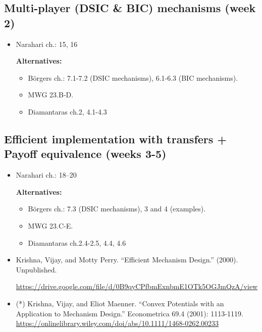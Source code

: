 \documentclass{article}
\begin{document}
\subsection{Multi-player (DSIC \& BIC) mechanisms (week 2)}
\begin{itemize}
	\item Narahari ch.: 15, 16
	
	\textbf{Alternatives:}
	\begin{itemize}
		\item B{\"o}rgers ch.: 7.1-7.2 (DSIC mechanisms), 6.1-6.3 (BIC mechanisms).%
		\item MWG 23.B-D.
		\item Diamantaras ch.2, 4.1-4.3
	\end{itemize}
\end{itemize}

\subsection{Efficient implementation with transfers + Payoff equivalence (weeks 3-5)}
\begin{itemize}
	\item Narahari ch.: 18--20
	
	\textbf{Alternatives:}
	\begin{itemize}
		\item B{\"o}rgers ch.: 7.3 (DSIC mechanisms), 3 and 4 (examples).
		\item MWG 23.C-E.
		\item Diamantaras ch.2.4-2.5, 4.4, 4.6
	\end{itemize}
	\item Krishna, Vijay, and Motty Perry. ``Efficient Mechanism Design.'' (2000). Unpublished.
	
	\url{https://drive.google.com/file/d/0B9qyCPfbmExnbmE1OTk5OGJmQzA/view}
	
	\item (*) Krishna, Vijay, and Eliot Maenner. ``Convex Potentials with an Application to Mechanism Design.'' Econometrica 69.4 (2001): 1113-1119.\\
	\url{https://onlinelibrary.wiley.com/doi/abs/10.1111/1468-0262.00233}
\end{itemize}
\end{document}
